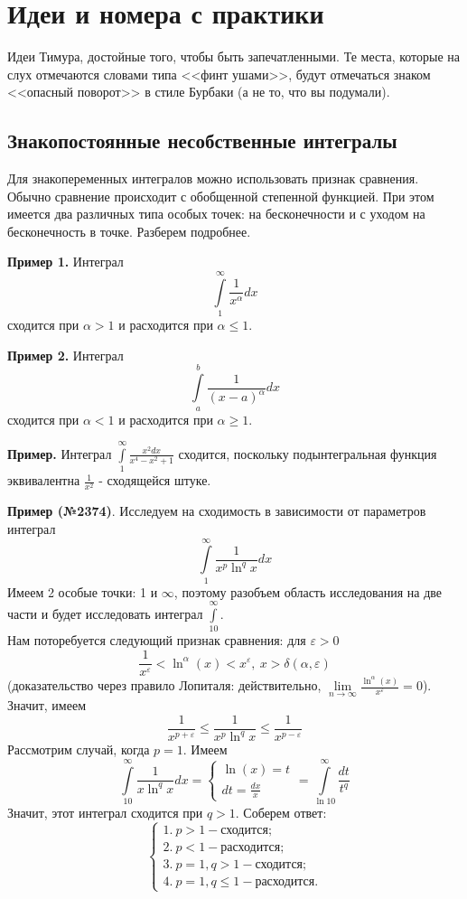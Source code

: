 \chapter{Идеи и номера с практики}
Идеи Тимура, достойные того, чтобы быть запечатленными.
Те места, которые на слух отмечаются словами типа <<финт ушами>>, будут 
отмечаться знаком <<опасный поворот>> \dbend в стиле Бурбаки (а не то, что
вы подумали). 

\section{Знакопостоянные несобственные интегралы}
Для знакопеременных интегралов можно использовать признак сравнения.
Обычно сравнение происходит с обобщенной степенной функцией.
При этом имеется два различных типа особых точек: на бесконечности и 
с уходом на бесконечность в точке. Разберем подробнее.

\textbf{Пример 1.} Интеграл 
$$\int\limits_{1}^{\infty}\frac{1}{x^\alpha}dx$$ 
сходится при $\alpha>1$ и расходится при $\alpha\leqslant 1$.

\textbf{Пример 2.} Интеграл
$$\int\limits_{a}^{b}\frac{1}{(x-a)^\alpha}dx$$
сходится при $\alpha<1$ и расходится при $\alpha\geqslant 1$. 

\textbf{Пример.} Интеграл $\int\limits_{1}^{\infty} \frac{x^2dx}{x^4-x^2+1}$ 
сходится, поскольку подынтегральная функция эквивалентна $\frac{1}{x^2}$ - 
сходящейся штуке.


\textbf{Пример (№2374)}. Исследуем на сходимость в зависимости от параметров
интеграл
$$\int\limits_{1}^{\infty} \frac{1}{x^p\ln^q x}dx$$
Имеем 2 особые точки: 1 и $\infty$, поэтому разобъем область исследования
на две части и будет исследовать интеграл $\int\limits_{10}^{\infty}$.\\
Нам поторебуется следующий признак сравнения: для $\varepsilon>0$
$$\frac{1}{x^\varepsilon}<\ln^\alpha(x)<x^\varepsilon,~
x>\delta(\alpha,\varepsilon)$$ 
(доказательство через правило Лопиталя: действительно, 
$\lim\limits_{n \to \infty} \frac{\ln^\alpha(x)}{x^\varepsilon}=0$).\\
Значит, имеем
$$\frac{1}{x^{p+\varepsilon}}\leqslant \frac{1}{x^p\ln^qx}\leqslant 
\frac{1}{x^{p-\varepsilon}}$$ 
Рассмотрим случай, когда $p=1$. Имеем 
$$\int\limits_{10}^{\infty} \frac{1}{x\ln^qx}dx = 
\begin{cases}\ln(x)=t\\dt=\frac{dx}{x}\end{cases} = 
\int\limits_{\ln 10}^{\infty}\frac{dt}{t^q}$$ 
Значит, этот интеграл сходится при $q>1$.
Соберем ответ:
$$\begin{cases}
    1.~ p>1 - \text{сходится;}\\
    2.~ p<1 - \text{расходится;}\\
    3.~ p=1,q>1 - \text{сходится;}\\
    4.~ p=1,q\leqslant 1 - \text{расходится.}
\end{cases}$$



